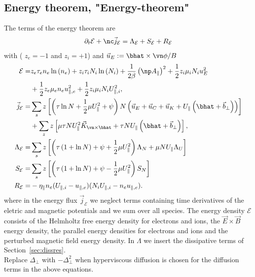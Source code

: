 \subsection{Energy theorem, "Energy-theorem"}
The terms of the energy theorem are
\begin{align} \label{eq:energy_theorem}
\partial_t \mathcal E +
\nc \vec j_{\mathcal E}
= \Lambda_{\mathcal E}
+  S_{\mathcal E}
+  R_{\mathcal E}
\end{align}
with ( $z_e=-1$ and $z_i=+1$) and $\vec u_E := {\bhat\times \vn\phi}/{B}$
\begin{align} \label{eq:energy_conservation}
  \mathcal{E}= & z_e\tau_e n_e \ln{(n_e)} +z_i\tau_i N_i\ln{(N_i)}
  +\frac{1}{2\beta}\left(\np A_\parallel\right)^2
   +  \frac{1}{2} z_i \mu_i N_i u_E^2  \nonumber\\
   & +\frac{1}{2} z_e\mu_e  n_e u_{\parallel,e}^2
  +\frac{1}{2} z_i\mu_i  N_i U_{\parallel,i}^2,\\
  \vec j_{\mathcal E} =& \sum_s z\left[
  \left(\tau \ln N + \frac{1}{2}\mu U_\parallel^2 + \psi \right)N\left(
  \vec u_E + \vec u_C + \vec u_{K} +U_\parallel\left(\bhat+{\vec b}_\perp\right)  \right) \right]
  \nonumber\\
  &+ \sum_z z\left[\mu \tau NU_\parallel^2\vec K_{\vn\times\bhat} + \tau NU_\parallel \left(\bhat + {\vec b}_\perp\right)\right], \\
  \Lambda_{\mathcal E} =&  \sum_s z\left[\left( \tau\left( 1+\ln{N}\right) + \psi + \frac{1}{2} \mu U_\parallel^2 \right)
  \Lambda_N  +  \mu NU_\parallel\Lambda_U  \right]
\nonumber \\
  S_{\mathcal E} =&  \sum_s  z\left[ \left(\tau\left( 1+\ln{N}\right) +\psi - \frac{1}{2} \mu U_\parallel^2 \right)S_{N}\right]
\nonumber \\
R_{\mathcal E} =&  -\eta_\parallel  n_e(U_{\parallel,i}-u_{\parallel,e})(N_iU_{\parallel,i} - n_eu_{\parallel,e}).
\end{align}
where in the energy flux $\vec j_{\mathcal E}$
we neglect terms  containing time derivatives
of the eletric and magnetic potentials and we sum over all species.
The energy density $\mathcal E$ consists of the Helmholtz free energy density for electrons and ions,
the \(\vec{E} \times \vec{B}\) energy density, the parallel energy densities for electrons and ions and the perturbed magnetic field energy density.
In \(\Lambda\) we insert the dissipative terms of Section~\ref{sec:dissres}. \\
Replace $\Delta_\perp$ with $-\Delta_\perp^2$ when hyperviscous diffusion is chosen
for the diffusion terms in the above equations.

